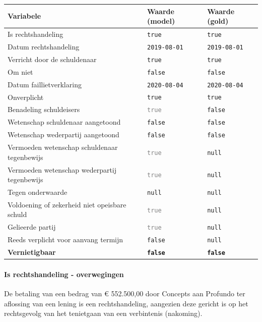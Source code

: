 \documentclass[
  dutch,
  a4paper,
]{article}
\begin{document}
\begin{center}
\small
\begin{tabular}{@{}p{7.4cm}p{2.6cm}p{2.6cm}@{}}
\toprule
Variabele & Waarde (model) & Waarde (gold) \\
\midrule
Is rechtshandeling & \texttt{true} & \texttt{true} \\
Datum rechtshandeling & \texttt{2019-08-01} & \texttt{2019-08-01} \\
Verricht door de schuldenaar & \texttt{true} & \texttt{true} \\
Om niet & \texttt{false} & \texttt{false} \\
Datum faillietverklaring & \texttt{2020-08-04} & \texttt{2020-08-04} \\
Onverplicht & \texttt{true} & \texttt{true} \\
Benadeling schuldeisers & \textcolor{gray}{\texttt{true}} & \texttt{false} \\
Wetenschap schuldenaar aangetoond & \texttt{false} & \texttt{false} \\
Wetenschap wederpartij aangetoond & \texttt{false} & \texttt{false} \\
Vermoeden wetenschap schuldenaar tegenbewijs & \textcolor{gray}{\texttt{true}} & \texttt{null} \\
Vermoeden wetenschap wederpartij tegenbewijs & \textcolor{gray}{\texttt{true}} & \texttt{null} \\
Tegen onderwaarde & \texttt{null} & \texttt{null} \\
Voldoening of zekerheid niet opeisbare schuld & \textcolor{gray}{\texttt{true}} & \texttt{null} \\
Gelieerde partij & \textcolor{gray}{\texttt{true}} & \texttt{null} \\
Reeds verplicht voor aanvang termijn & \texttt{false} & \texttt{null} \\
\textbf{Vernietigbaar} & \textbf{\texttt{false}} & \textbf{\texttt{false}} \\
\bottomrule
\end{tabular}
\end{center}

\paragraph{Is rechtshandeling - overwegingen}\label{is-rechtshandeling---overwegingen-38}

De betaling van een bedrag van € 552.500,00 door Concepts aan Profundo ter aflossing van een lening is een rechtshandeling, aangezien deze gericht is op het rechtsgevolg van het tenietgaan van een verbintenis (nakoming).
\end{document}
